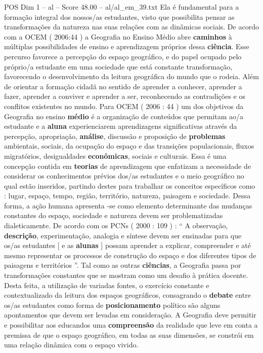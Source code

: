 \begin{textsample}{POS Dim 1 – al – Score 48.00 – al/al\_em\_39.txt}
Ela é fundamental para a formação integral dos nossos/as estudantes, visto que possibilita pensar as transformações da natureza nas suas relações com as dinâmicas sociais.
De acordo com a OCEM ( 2006:44 ) a Geografia no Ensino Médio abre \textbf{caminhos} à múltiplas possibilidades de ensino e aprendizagem próprios dessa \textbf{ciência}.
Esse percurso favorece a percepção do espaço geográfico, e do papel ocupado pelo próprio/a estudante em uma sociedade que está constante transformação, favorecendo o desenvolvimento da leitura geográfica do mundo que o rodeia.
Além de orientar a formação cidadã no sentido de aprender a conhecer, aprender a fazer, aprender a conviver e aprender a ser, reconhecendo as contradições e os conflitos existentes no mundo.
Para OCEM ( 2006 : 44 ) um dos objetivos da Geografia no ensino \textbf{médio} é a organização de conteúdos que permitam ao/a estudante e a \textbf{aluna} experienciarem aprendizagens significativas através da percepção, apropriação, \textbf{análise}, discussão e proposição de \textbf{problemas} ambientais, sociais, da ocupação do espaço e das transições populacionais, fluxos migratórios, desigualdades \textbf{econômicas}, sociais e culturais.
Essa é uma concepção contida em \textbf{teorias} de aprendizagem que enfatizam a necessidade de considerar os conhecimentos prévios dos/as estudantes e o meio geográfico no qual estão inseridos, partindo destes para trabalhar os conceitos específicos como : lugar, espaço, tempo, região, território, natureza, paisagem e sociedade.
Dessa forma, a ação humana apresenta -se como elemento determinante das mudanças constantes do espaço, sociedade e natureza devem ser problematizadas dialeticamente.
De acordo com os PCNs ( 2000 : 109 ) : “ A observação, \textbf{descrição}, experimentação, analogia e síntese devem ser ensinadas para que os/as estudantes [ e as \textbf{alunas} ] possam aprender a explicar, compreender e até mesmo representar os processos de construção do espaço e dos diferentes tipos de paisagens e territórios ”.
Tal como as outras \textbf{ciências}, a Geografia passa por transformações constantes que se mostram como um desafio à prática docente.
Desta feita, a utilização de variadas fontes, o exercício constante e contextualizado da leitura dos espaços geográficos, consagrando o \textbf{debate} entre os/as estudantes como forma de \textbf{posicionamento} político são alguns apontamentos que devem ser levadas em consideração.
A Geografia deve permitir e possibilitar aos educandos uma \textbf{compreensão} da realidade que leve em conta a premissa de que o espaço geográfico, em todas as suas dimensões, se constrói em uma relação dinâmica com o espaço vivido.

\end{textsample}
